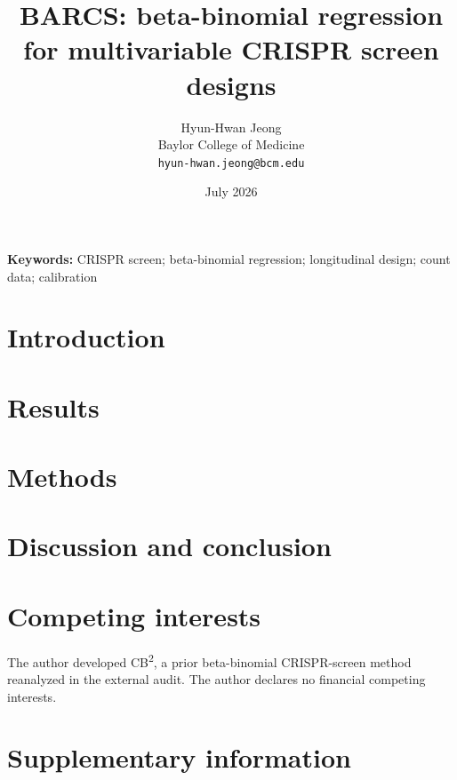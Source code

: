 \documentclass[11pt]{article}
\title{BARCS: beta-binomial regression for multivariable CRISPR screen designs}
\author{Hyun-Hwan Jeong\\
\normalsize Baylor College of Medicine\\
\normalsize \texttt{hyun-hwan.jeong@bcm.edu}}
\date{July 2026}
\begin{document}
\maketitle



\noindent\textbf{Keywords:} CRISPR screen; beta-binomial regression;
longitudinal design; count data; calibration
\vspace{0.18in}

\section{Introduction}


\section{Results}



\section{Methods}


\section{Discussion and conclusion}


\section*{Competing interests}
The author developed CB\textsuperscript{2}, a prior beta-binomial CRISPR-screen
method reanalyzed in the external audit.  The author declares no financial
competing interests.



\clearpage
\appendix
\section{Supplementary information}

\end{document}
